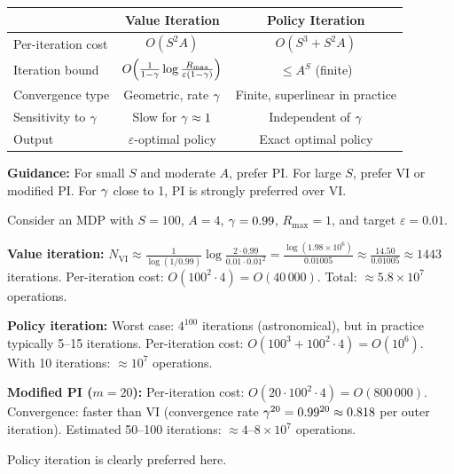 \documentclass[11pt,a4paper]{article}
\begin{document}
\begin{keyresult}[title={Value Iteration vs.\ Policy Iteration}]
\label{kr:vi-vs-pi}
\begin{center}
\begin{tabular}{lcc}
\toprule
& \textbf{Value Iteration} & \textbf{Policy Iteration} \\
\midrule
Per-iteration cost & $O(S^2 A)$ & $O(S^3 + S^2 A)$ \\
Iteration bound & $O\!\left(\frac{1}{1-\gamma}
\log \frac{R_{\max}}{\varepsilon(1-\gamma)}\right)$ &
$\leq A^S$ (finite) \\
Convergence type & Geometric, rate $\gamma$ &
Finite, superlinear in practice \\
Sensitivity to $\gamma$ & Slow for $\gamma \approx 1$ &
Independent of $\gamma$ \\
Output & $\varepsilon$-optimal policy & Exact optimal policy \\
\bottomrule
\end{tabular}
\end{center}
\textbf{Guidance:} For small $S$ and moderate $A$, prefer PI. For
large $S$, prefer VI or modified PI. For $\gamma$ close to 1,
PI is strongly preferred over VI.
\end{keyresult}

\begin{example}
\label{ex:comparison}
Consider an MDP with $S = 100$, $A = 4$, $\gamma = 0.99$,
$R_{\max} = 1$, and target $\varepsilon = 0.01$.

\textbf{Value iteration:}
$N_{\mathrm{VI}} \approx
\frac{1}{\log(1/0.99)}\log\frac{2 \cdot 0.99}
{0.01 \cdot 0.01^2}
= \frac{\log(1.98 \times 10^6)}{0.01005}
\approx \frac{14.50}{0.01005} \approx 1443$ iterations.
Per-iteration cost: $O(100^2 \cdot 4) = O(40\,000)$.
Total: $\approx 5.8 \times 10^7$ operations.

\textbf{Policy iteration:}
Worst case: $4^{100}$ iterations (astronomical), but in practice
typically 5--15 iterations.
Per-iteration cost: $O(100^3 + 100^2 \cdot 4) = O(10^6)$.
With 10 iterations: $\approx 10^7$ operations.

\textbf{Modified PI ($m = 20$):}
Per-iteration cost: $O(20 \cdot 100^2 \cdot 4) = O(800\,000)$.
Convergence: faster than VI (convergence rate $\gamma^{20}
= 0.99^{20} \approx 0.818$ per outer iteration).
Estimated 50--100 iterations: $\approx 4$--$8 \times 10^7$ operations.

Policy iteration is clearly preferred here.
\end{example}
\end{document}
